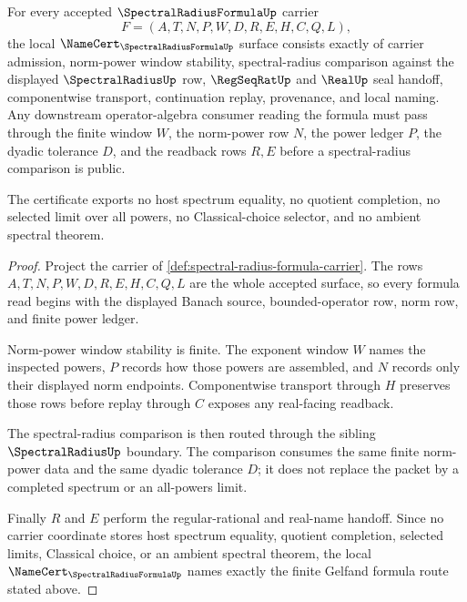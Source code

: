 \begin{theorem}
\label{thm:spectral-radius-formula-namecert-obligations}
For every accepted $\SpectralRadiusFormulaUp$ carrier
$$
F=(A,T,N,P,W,D,R,E,H,C,Q,L),
$$
the local $\NameCert_{\SpectralRadiusFormulaUp}$ surface consists exactly of carrier admission, norm-power window stability, spectral-radius comparison against the displayed $\SpectralRadiusUp$ row, $\RegSeqRatUp$ and $\RealUp$ seal handoff, componentwise transport, continuation replay, provenance, and local naming. Any downstream operator-algebra consumer reading the formula must pass through the finite window $W$, the norm-power row $N$, the power ledger $P$, the dyadic tolerance $D$, and the readback rows $R,E$ before a spectral-radius comparison is public.

The certificate exports no host spectrum equality, no quotient completion, no selected limit over all powers, no Classical-choice selector, and no ambient spectral theorem.
\end{theorem}
\begin{proof}
Project the carrier of \autoref{def:spectral-radius-formula-carrier}. The rows $A,T,N,P,W,D,R,E,H,C,Q,L$ are the whole accepted surface, so every formula read begins with the displayed Banach source, bounded-operator row, norm row, and finite power ledger.

Norm-power window stability is finite. The exponent window $W$ names the inspected powers, $P$ records how those powers are assembled, and $N$ records only their displayed norm endpoints. Componentwise transport through $H$ preserves those rows before replay through $C$ exposes any real-facing readback.

The spectral-radius comparison is then routed through the sibling $\SpectralRadiusUp$ boundary. The comparison consumes the same finite norm-power data and the same dyadic tolerance $D$; it does not replace the packet by a completed spectrum or an all-powers limit.

Finally $R$ and $E$ perform the regular-rational and real-name handoff. Since no carrier coordinate stores host spectrum equality, quotient completion, selected limits, Classical choice, or an ambient spectral theorem, the local $\NameCert_{\SpectralRadiusFormulaUp}$ names exactly the finite Gelfand formula route stated above.
\end{proof}


